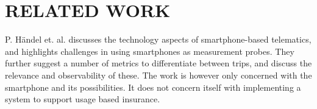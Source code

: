 \section{RELATED WORK}\label{sec:relatedwork}

P. Händel et. al. discusses the technology aspects of smartphone-based telematics, and highlights challenges in using smartphones as measurement probes\cite{art:insurtelematics}. They further suggest a number of metrics to differentiate between trips, and discuss the relevance and observability of these. The work is however only concerned with the smartphone and its possibilities. It does not concern itself with implementing a system to support usage based insurance.